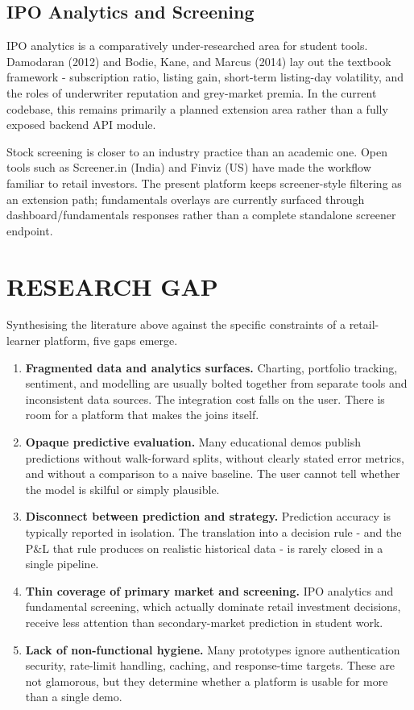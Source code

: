 \documentclass[12pt,a4paper]{report}
\numberwithin{equation}{chapter}
\begin{document}
\subsection{IPO Analytics and Screening}

IPO analytics is a comparatively under-researched area for student tools. Damodaran (2012) and Bodie, Kane, and Marcus (2014) lay out the textbook framework - subscription ratio, listing gain, short-term listing-day volatility, and the roles of underwriter reputation and grey-market premia. In the current codebase, this remains primarily a planned extension area rather than a fully exposed backend API module.

Stock screening is closer to an industry practice than an academic one. Open tools such as Screener.in (India) and Finviz (US) have made the workflow familiar to retail investors. The present platform keeps screener-style filtering as an extension path; fundamentals overlays are currently surfaced through dashboard/fundamentals responses rather than a complete standalone screener endpoint.

\section{RESEARCH GAP}

Synthesising the literature above against the specific constraints of a retail-learner platform, five gaps emerge.

\begin{enumerate}
  \item \textbf{Fragmented data and analytics surfaces.} Charting, portfolio tracking, sentiment, and modelling are usually bolted together from separate tools and inconsistent data sources. The integration cost falls on the user. There is room for a platform that makes the joins itself.
  \item \textbf{Opaque predictive evaluation.} Many educational demos publish predictions without walk-forward splits, without clearly stated error metrics, and without a comparison to a naive baseline. The user cannot tell whether the model is skilful or simply plausible.
  \item \textbf{Disconnect between prediction and strategy.} Prediction accuracy is typically reported in isolation. The translation into a decision rule - and the P\&L that rule produces on realistic historical data - is rarely closed in a single pipeline.
  \item \textbf{Thin coverage of primary market and screening.} IPO analytics and fundamental screening, which actually dominate retail investment decisions, receive less attention than secondary-market prediction in student work.
  \item \textbf{Lack of non-functional hygiene.} Many prototypes ignore authentication security, rate-limit handling, caching, and response-time targets. These are not glamorous, but they determine whether a platform is usable for more than a single demo.
\end{enumerate}
\end{document}
